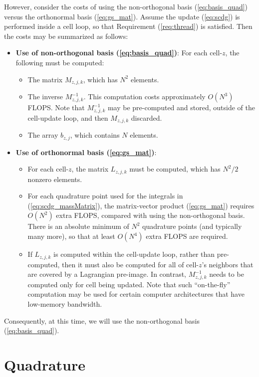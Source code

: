 \documentclass[11pt]{report}
\begin{document}
However, consider the costs of using the non-orthogonal basis
(\ref{eq:basis_quad}) versus the orthonormal basis (\ref{eq:gs_mat}).  Assume
the update (\ref{eq:scdg}) is performed inside a cell loop, so that
Requirement (\ref{req:thread}) is satisfied.  Then the costs may be summarized
as follows:
\begin{itemize}
\item {\bf Use of non-orthogonal basis (\ref{eq:basis_quad})}: For each
  cell-$z$, the following must be computed:
  \begin{itemize}
  \item The matrix $M_{z,j,k}$, which has $N^2$ elements.
  \item The inverse $M^{-1}_{z,j,k}$.  This computation costs approximately
    $O(N^3)$ FLOPS.  Note that $M^{-1}_{z,j,k}$ may be pre-computed and
    stored, outside of the cell-update loop, and then $M_{z,j,k}$ discarded.
  \item The array $b_{z,j}$, which contains $N$ elements.
  \end{itemize}
\item {\bf Use of orthonormal basis (\ref{eq:gs_mat})}:
  \begin{itemize}
  \item For each cell-$z$, the matrix $L_{z,j,k}$ must be
  computed, which has $N^2 / 2$ nonzero elements.
  \item For each quadrature point used for the integrals in
    (\ref{eq:scdg_massMatrix}), the matrix-vector product (\ref{eq:gs_mat})
    requires $O(N^2)$ extra FLOPS, compared with using the non-orthogonal
    basis.  There is an absolute minimum of $N^2$ quadrature points (and
    typically many more), so that at least $O(N^4)$ extra FLOPS are required.
  \item If $L_{z,j,k}$ is computed within the cell-update loop, rather than
    pre-computed, then it must also be computed for all of cell-$z$'s
    neighbors that are covered by a Lagrangian pre-image.  In contrast,
    $M^{-1}_{z,j,k}$ needs to be computed only for cell being updated.  Note
    that such ``on-the-fly'' computation may be used for certain computer
    architectures that have low-memory bandwidth.
  \end{itemize}
\end{itemize}
Consequently, at this time, we will use the non-orthogonal basis
(\ref{eq:basis_quad}).

\section{Quadrature}
\label{sec:quadrature}
\end{document}
